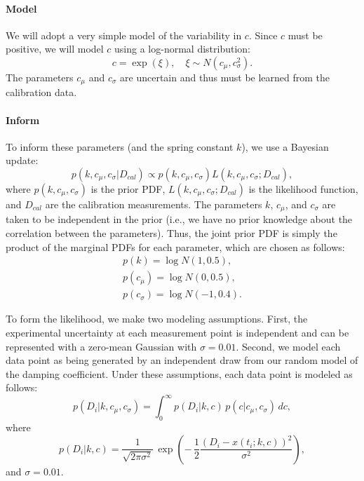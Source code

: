 \documentclass[11pt]{article}
\begin{document}
\paragraph{Model}
We will adopt a very simple model of the variability in $c$.  Since
$c$ must be positive, we will model $c$ using a log-normal
distribution:
%
\begin{equation*}
c = \exp( \xi ), \quad \xi \sim N(c_{\mu}, c_{\sigma}^2).
\end{equation*}
%
The parameters $c_{\mu}$ and $c_{\sigma}$ are uncertain and thus must
be learned from the calibration data. 

\paragraph{Inform} To inform these parameters (and the spring constant $k$), we use a
Bayesian update:
%
\begin{equation*}
p(k, c_{\mu}, c_{\sigma} | D_{cal}) \propto p(k, c_{\mu}, c_{\sigma}) L(k, c_{\mu}, c_{\sigma}; D_{cal}),
\end{equation*}
%
where $p(k, c_{\mu}, c_{\sigma})$ is the prior PDF, $L(k, c_{\mu},
c_{\sigma}; D_{cal})$ is the likelihood function, and $D_{cal}$ are
the calibration measurements.  The parameters $k$, $c_{\mu}$, and
$c_{\sigma}$ are taken to be independent in the prior (i.e., we have
no prior knowledge about the correlation between the parameters).
Thus, the joint prior PDF is simply the product of the marginal PDFs
for each parameter, which are chosen as follows:
%
\begin{gather*}
p(k) = \log N(1, 0.5), \\
p(c_{\mu}) = \log N(0, 0.5), \\
p(c_{\sigma}) = \log N(-1, 0.4).
\end{gather*}
%

To form the likelihood, we make two modeling assumptions.  First, the
experimental uncertainty at each measurement point is independent and
can be represented with a zero-mean Gaussian with $\sigma = 0.01$.
Second, we model each data point as being generated by an independent
draw from our random model of the damping coefficient.  Under these
assumptions, each data point is modeled as follows:
%
\begin{equation*}
p(D_i | k, c_{\mu}, c_{\sigma} ) = \int_{0}^{\infty} p(D_i | k, c) \, p(c | c_{\mu}, c_{\sigma}) \, dc,
\end{equation*}
%
where
%
\begin{equation*}
p(D_i | k, c) = \frac{1}{\sqrt{2 \pi \sigma^2}} \, \exp \left( -\, \frac{1}{2} \frac{(D_i - x(t_i; k, c))^2}{\sigma^2} \right),
\end{equation*}
%
and $\sigma = 0.01$.
\end{document}
